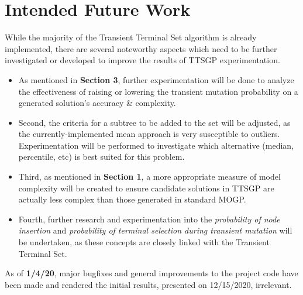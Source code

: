 \documentclass[a4paper]{article}
\begin{document}
\section{Intended Future Work}
While the majority of the Transient Terminal Set algorithm is already implemented, there are several noteworthy aspects which need to be further investigated or developed to improve the results of TTSGP experimentation. \begin{itemize}
	\item As mentioned in \textbf{Section 3}, further experimentation will be done to analyze the effectiveness of raising or lowering the transient mutation probability on a generated solution's accuracy \& complexity.
	\item Second, the criteria for a subtree to be added to the set will be adjusted, as the currently-implemented mean approach is very susceptible to outliers. Experimentation will be performed to investigate which alternative (median, percentile, etc) is best suited for this problem.
	\item Third, as mentioned in \textbf{Section 1}, a more appropriate measure of model complexity will be created to ensure candidate solutions in TTSGP are actually less complex than those generated in standard MOGP.
	\item Fourth, further research and experimentation into the \textit{probability of node insertion} and \textit{probability of terminal selection during transient mutation} will be undertaken, as these concepts are closely linked with the Transient Terminal Set.
\end{itemize}
As of \textbf{1/4/20}, major bugfixes and general improvements to the project code have been made and rendered the initial results, presented on 12/15/2020, irrelevant.
\end{document}
